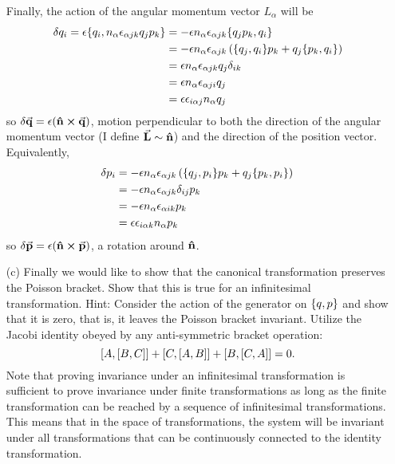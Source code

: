 \documentclass[a4paper,twoside]{article}
\begin{document}
\begin{itemize}
\begin{problem}
            Finally, the action of the angular momentum vector $ L_{\alpha} $ will be
            \begin{align}
                \delta q_i = \epsilon \pb{q_i}{n_{\alpha}\epsilon_{\alpha jk} q_j p_k} &= - \epsilon n_{\alpha}\epsilon_{\alpha jk} \pb{q_j p_k}{q_i} \\
                &= - \epsilon n_{\alpha} \epsilon_{\alpha jk}\left( \pb{q_j}{q_i} p_k + q_j\pb{p_k}{q_i} \right) \\
                &= \epsilon n_{\alpha} \epsilon_{\alpha jk} q_j \delta_{ik} \\
                &= \epsilon n_{\alpha} \epsilon_{\alpha ji} q_j \\
                &= \epsilon \epsilon_{i \alpha j} n_{\alpha} q_j
            \end{align}
            so $ \delta \va{q} = \epsilon (\vu{n} \cross \va{q}) $, motion perpendicular to both the direction of the angular momentum vector (I define $ \va{L} \sim \vu{n} $) and the direction of the position vector. Equivalently,
            \begin{align}
                \delta p_i &= - \epsilon n_{\alpha} \epsilon_{\alpha jk} \left( \pb{q_j}{p_i} p_k + q_j \pb{p_k}{p_i} \right) \\
                &= - \epsilon n_{\alpha}\epsilon_{\alpha jk} \delta_{ij} p_k \\
                &= - \epsilon n_{\alpha} \epsilon_{\alpha ik} p_k \\
                &= \epsilon \epsilon_{i \alpha k} n_{\alpha} p_k
            \end{align}
            so $ \delta \va{p} = \epsilon (\vu{n} \cross \va{p}) $, a rotation around $ \vu{n} $.
        \end{problem}
    \item[(c)] Finally we would like to show that the canonical transformation preserves the Poisson bracket. Show that this is true for an infinitesimal transformation. Hint: Consider the action of the generator on $ \pb{q}{p} $ and show that it is zero, that is, it leaves the Poisson bracket invariant. Utilize the Jacobi identity obeyed by any anti-symmetric bracket operation:
        \begin{equation}
            \comm{A}{\comm{B}{C}} + \comm{C}{\comm{A}{B}} + \comm{B}{\comm{C}{A}} = 0.
        \end{equation}
        Note that proving invariance under an infinitesimal transformation is sufficient to prove invariance under finite transformations as long as the finite transformation can be reached by a sequence of infinitesimal transformations. This means that in the space of transformations, the system will be invariant under all transformations that can be continuously connected to the identity transformation.

\end{itemize}
\end{document}
